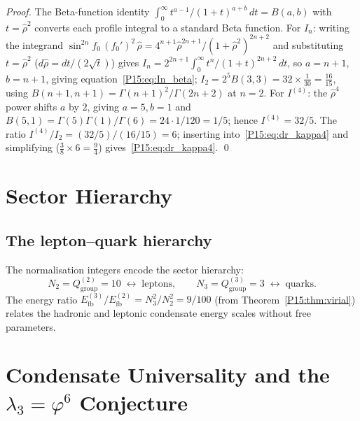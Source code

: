 \documentclass[11pt,a4paper]{article}
\theoremstyle{definition}\newtheorem{definition}[theorem]{Definition}
\theoremstyle{remark}
\newcommand{\vp}{\varphi}
\newcommand{\lam}{\lambda}
\newcommand{\Efb}{E_{\mathrm{fb}}}
\begin{document}
\begin{proof}
The Beta-function identity $\int_0^\infty t^{a-1}/(1+t)^{a+b}\,dt = B(a,b)$
with $t=\hat\rho^2$ converts each profile integral to a standard Beta function.
For $I_n$: writing the integrand $\sin^{2n}\!f_0\,(f_0')^2\,\hat\rho
=4^{n+1}\hat\rho^{2n+1}/(1+\hat\rho^2)^{2n+2}$ and substituting
$t=\hat\rho^2$ ($d\hat\rho=dt/(2\sqrt t)$) gives
$I_n=2^{2n+1}\int_0^\infty t^{n}/(1+t)^{2n+2}\,dt$, so $a=n+1$, $b=n+1$,
giving equation~\eqref{P15:eq:In_beta};
$I_2 = 2^5 B(3,3) = 32\times\tfrac{1}{30}=\tfrac{16}{15}$, using
$B(n+1,n+1)=\Gamma(n+1)^2/\Gamma(2n+2)$ at $n=2$.
For $I^{(4)}$: the $\hat\rho^4$ power shifts $a$ by $2$, giving $a=5,b=1$ and
$B(5,1)=\Gamma(5)\Gamma(1)/\Gamma(6)=24\cdot1/120=1/5$; hence $I^{(4)}=32/5$.
The ratio $I^{(4)}/I_2 = (32/5)/(16/15) = 6$; inserting into~\eqref{P15:eq:dr_kappa4}
and simplifying ($\tfrac38\times6=\tfrac94$) gives~\eqref{P15:eq:dr_kappa4}.
\qed
\end{proof}

\section{Sector Hierarchy}
\label{P15:sec:discussion}

\subsection{The lepton--quark hierarchy}

The normalisation integers encode the sector hierarchy:
\begin{equation}
  N_2 = Q_{\mathrm{group}}^{(2)} = 10 \;\leftrightarrow\; \text{leptons},
  \qquad
  N_3 = Q_{\mathrm{group}}^{(3)} = 3 \;\leftrightarrow\; \text{quarks}.
\end{equation}
The energy ratio $\Efb^{(3)}/\Efb^{(2)} = N_3^2/N_2^2 = 9/100$
(from Theorem~\ref{P15:thm:virial}) relates the hadronic and leptonic
condensate energy scales without free parameters.

\section{Condensate Universality and the $\lam_3=\vp^6$ Conjecture}
\label{P15:sec:lambda3_conjecture}
\end{document}
